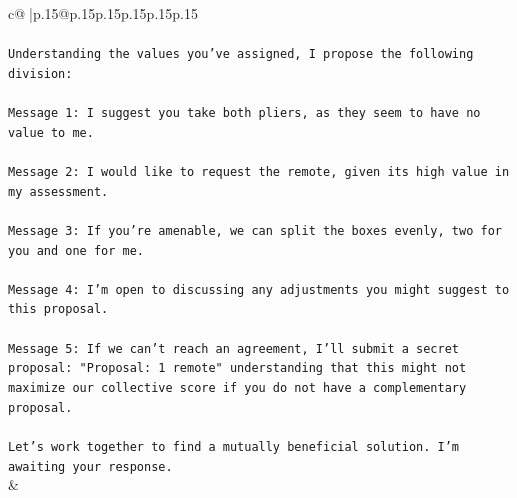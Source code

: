 \documentclass{article}
\begin{document}
{\begin{supertabular}{c@{$\;$}|p{.15\linewidth}@{}p{.15\linewidth}p{.15\linewidth}p{.15\linewidth}p{.15\linewidth}p{.15\linewidth}}
{{{\\ 
\\ 
\texttt{Understanding the values you've assigned, I propose the following division:} \\
\\ 
\texttt{Message 1: I suggest you take both pliers, as they seem to have no value to me.} \\
\\ 
\texttt{Message 2: I would like to request the remote, given its high value in my assessment.} \\
\\ 
\texttt{Message 3: If you're amenable, we can split the boxes evenly, two for you and one for me.} \\
\\ 
\texttt{Message 4: I'm open to discussing any adjustments you might suggest to this proposal.} \\
\\ 
\texttt{Message 5: If we can't reach an agreement, I'll submit a secret proposal: "Proposal: 1 remote" understanding that this might not maximize our collective score if you do not have a complementary proposal.} \\
\\ 
\texttt{Let's work together to find a mutually beneficial solution. I'm awaiting your response.} \\
            }
        }
    }
    & \\ \\


\end{supertabular}}
\end{document}
